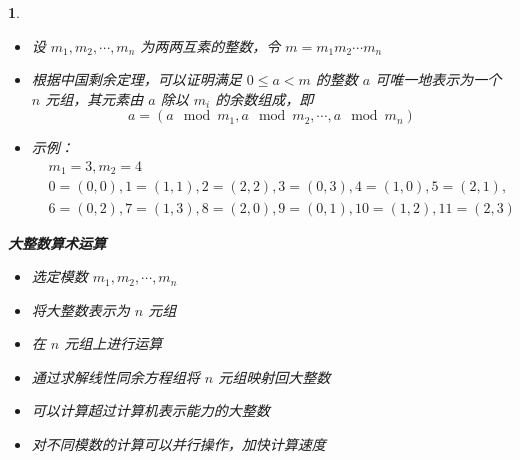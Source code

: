 \documentclass[UTF8]{report}
\theoremstyle{MyLineTheoremStyle} %
\theoremstyle{MyBlockTheoremStyle} %
\theoremstyle{MySubsubsectionStyle} %
\newtheorem{definition}{}
\begin{document}
\begin{definition}
    \begin{itemize}
        \item 设 $m_1, m_2, \cdots, m_n$ 为两两互素的整数，令 $m = m_1m_2 \cdots m_n$
        \item 根据中国剩余定理，可以证明满足 $0 \leq a < m$ 的整数 $a$ 可唯一地表示为一个 $n$ 元组，其元素由 $a$ 除以 $m_i$ 的余数组成，即
        \[
        a = (a \mod m_1, a \mod m_2, \cdots, a \mod m_n)
        \]
        \item 示例：
        \[
        \begin{aligned}
            &m_1 = 3, m_2 = 4 \\
            &0 = (0, 0), 1 = (1, 1), 2 = (2, 2), 3 = (0, 3), 4 = (1, 0), 5 = (2, 1), \\
            &6 = (0, 2), 7 = (1, 3), 8 = (2, 0), 9 = (0, 1), 10 = (1, 2), 11 = (2, 3)
        \end{aligned}
        \]
    \end{itemize}

    \textbf{大整数算术运算}
    \begin{itemize}
        \item 选定模数 $m_1, m_2, \cdots, m_n$
        \item 将大整数表示为 $n$ 元组
        \item 在 $n$ 元组上进行运算
        \item 通过求解线性同余方程组将 $n$ 元组映射回大整数
        \item 可以计算超过计算机表示能力的大整数
        \item 对不同模数的计算可以并行操作，加快计算速度
    \end{itemize}


\end{definition}
\end{document}
